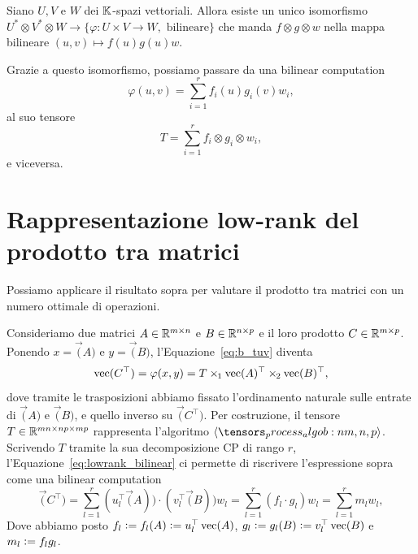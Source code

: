 \begin{proposition}
	\label{prop:iso_bil_tensor}
	Siano $ U,V $ e $ W $ dei $ \mathbb{K} $-spazi vettoriali. Allora esiste un unico isomorfismo $ U^*
		\otimes V^* \otimes W \to \{\varphi : U \times V \to  W, \text{ bilineare}\} $ che manda $ f
		\otimes g \otimes w $ nella mappa bilineare $ (u,v) \mapsto f(u)g(u)w $.
\end{proposition}
\begin{remark}
	Grazie a questo isomorfismo, possiamo passare da una bilinear computation
	\begin{equation*}
		\varphi(u,v) = \sum_{i=1}^r f_{i}(u)g_{i}(v)w_{i},
	\end{equation*}
	al suo tensore
	\begin{equation*}
		T = \sum_{i = 1}^r f_{i} \otimes g_{i} \otimes w_{i},
	\end{equation*}
	e viceversa.

\end{remark}





\section{Rappresentazione low-rank del prodotto tra matrici}
Possiamo applicare il risultato sopra per valutare il prodotto tra matrici con un numero ottimale di operazioni.

Consideriamo due matrici $ A \in \mathbb{R}^{m \times n} $ e $ B \in \mathbb{R}^{n \times p} $ e il loro prodotto $
	C \in \mathbb{R}^{m \times p} $. Ponendo $ x =
	\Vec(A) $ e $ y=\Vec(B) $, l'Equazione~\eqref{eq:b_tuv} diventa
\begin{equation}
	\label{eq:mulvec}
	\Vec(C^\top) =\varphi(x,y) = T \ttm[1] \Vec(A)^{\top} \ttm[2] \Vec(B)^{\top},
\end{equation}
dove tramite le trasposizioni abbiamo fissato l'ordinamento naturale sulle entrate di $ \Vec(A) $ e $ \Vec(B) $, e quello
inverso su $
	\Vec(C^\top)$. Per costruzione, il tensore $ T \in \mathbb{R}^{mn\times np\times mp} $ rappresenta
l'algoritmo $ \algob{m,n,p} $. Scrivendo $ T $ tramite la sua decomposizione CP di rango $ r $,
l'Equazione~\eqref{eq:lowrank_bilinear} ci permette di riscrivere l'espressione sopra come una
bilinear computation
\begin{equation}
	\label{eq:mulvec:CP}
	\Vec(C^\top) =  \sum_{l=1}^r (u_l^\top \Vec(A)) \cdot
	(v_l^\top\Vec(B))w_l = \sum_{l=1}^r (f_l \cdot
	g_l)w_l = \sum_{l=1}^r m_lw_l,
\end{equation}
Dove abbiamo posto $ f_l \vcentcolon=  f_{l}(A) \vcentcolon=  u_l^\top \operatorname{vec}(A)$, $ g_l \vcentcolon= g_{l}(B) \vcentcolon= v_l^\top\operatorname{vec}(B)$ e $ m_l \vcentcolon=
	f_lg_l $.

